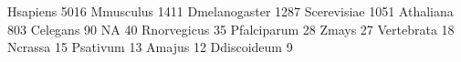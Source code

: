 \documentclass{article}
\renewenvironment{Schunk}{\vspace{\topsep}}{\vspace{\topsep}}
\begin{document}
\begin{Schunk}
\begin{Soutput}
                                                                     Hsapiens 
                                                                         5016 
                                                                    Mmusculus 
                                                                         1411 
                                                                Dmelanogaster 
                                                                         1287 
                                                                  Scerevisiae 
                                                                         1051 
                                                                    Athaliana 
                                                                          803 
                                                                     Celegans 
                                                                           90 
                                                                           NA 
                                                                           40 
                                                                  Rnorvegicus 
                                                                           35 
                                                                  Pfalciparum 
                                                                           28 
                                                                        Zmays 
                                                                           27 
                                                                   Vertebrata 
                                                                           18 
                                                                      Ncrassa 
                                                                           15 
                                                                     Psativum 
                                                                           13 
                                                                       Amajus 
                                                                           12 
                                                                  Ddiscoideum 
                                                                            9 

\end{Soutput}
\end{Schunk}
\end{document}
